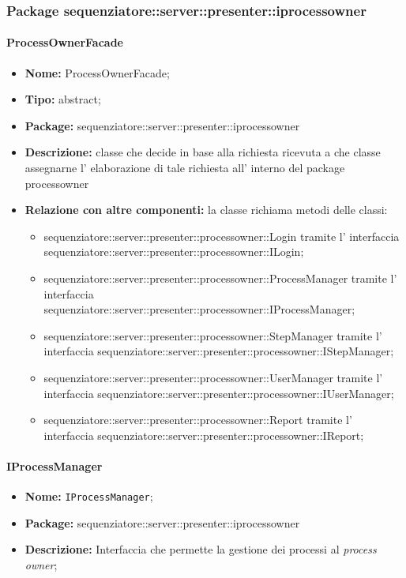 \subsubsection{Package sequenziatore::server::presenter::iprocessowner}
\paragraph{ProcessOwnerFacade}
	\begin{itemize}
		\item \textbf{Nome:} ProcessOwnerFacade;
		\item \textbf{Tipo:} abstract;
		\item \textbf{Package:} sequenziatore::server::presenter::iprocessowner
		\item \textbf{Descrizione:} classe che decide in base alla richiesta ricevuta a che classe assegnarne l' elaborazione di tale richiesta all' interno del package processowner
		\item \textbf{Relazione con altre componenti:} la classe richiama metodi delle classi:
		\begin{itemize}
			\item sequenziatore::server::presenter::processowner::Login tramite l' interfaccia sequenziatore::server::presenter::processowner::ILogin;
			\item sequenziatore::server::presenter::processowner::ProcessManager tramite l' interfaccia sequenziatore::server::presenter::processowner::IProcessManager;
			\item sequenziatore::server::presenter::processowner::StepManager tramite l' interfaccia sequenziatore::server::presenter::processowner::IStepManager;
			\item sequenziatore::server::presenter::processowner::UserManager tramite l' interfaccia sequenziatore::server::presenter::processowner::IUserManager;
			\item sequenziatore::server::presenter::processowner::Report tramite l' interfaccia
sequenziatore::server::presenter::processowner::IReport;
		\end{itemize}
	\end{itemize}
\paragraph{IProcessManager}
	\begin{itemize}
		\item \textbf{Nome:} \texttt{IProcessManager};
		\item \textbf{Package:} sequenziatore::server::presenter::iprocessowner
		\item \textbf{Descrizione:} Interfaccia che permette la gestione dei processi al \textit{process owner};
	\end{itemize}

